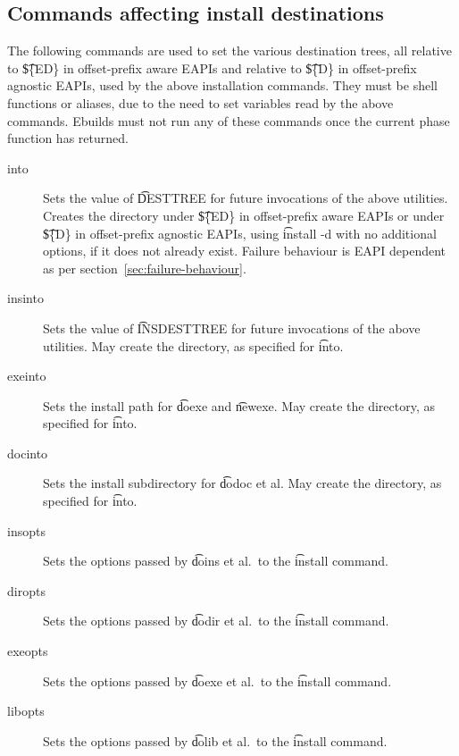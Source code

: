 \subsection{Commands affecting install destinations}
The following commands are used to set the various destination trees, all relative to \t{\$\{ED\}} in
offset-prefix aware EAPIs and relative to \t{\$\{D\}} in offset-prefix agnostic EAPIs, used by the
above installation commands. They must be shell functions or aliases, due to the need to set variables
read by the above commands. Ebuilds must not run any of these commands once the current phase function
has returned.

\begin{description}

\item[into] Sets the value of \t{DESTTREE} for future invocations
    of the above utilities. Creates the directory under \t{\$\{ED\}}
    in offset-prefix aware EAPIs or under \t{\$\{D\}} in offset-prefix
    agnostic EAPIs, using \t{install -d} with no additional options,
    if it does not already exist. Failure behaviour is EAPI dependent
    as per section~\ref{sec:failure-behaviour}.

\item[insinto] Sets the value of \t{INSDESTTREE} for future invocations of the above utilities. May
    create the directory, as specified for \t{into}.

\item[exeinto] Sets the install path for \t{doexe} and \t{newexe}. May create the directory, as specified
    for \t{into}.

\item[docinto] Sets the install subdirectory for \t{dodoc} et al. May create the directory, as specified
    for \t{into}.

\item[insopts] Sets the options passed by \t{doins} et al.\ to the \t{install} command.

\item[diropts] Sets the options passed by \t{dodir} et al.\ to the \t{install} command.

\item[exeopts] Sets the options passed by \t{doexe} et al.\ to the \t{install} command.

\item[libopts] Sets the options passed by \t{dolib} et al.\ to the \t{install} command.

\end{description}

